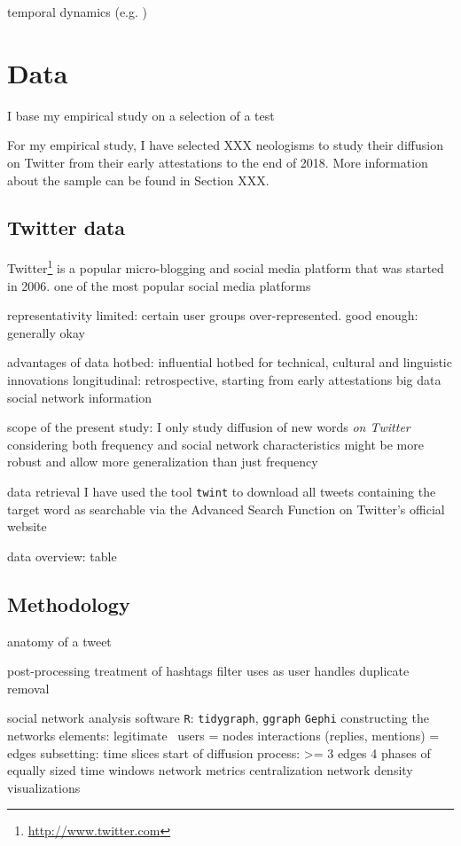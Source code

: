 \documentclass[draft, a4paper, abstract=on]{scrartcl}
\newcommand{\sw}[1]{\texttt{#1}}
\begin{document}
  temporal dynamics (e.g. )

\section{Data}

I base my empirical study on a selection of a test

For my empirical study, I have selected XXX neologisms to study their diffusion on Twitter from their early attestations to the end of 2018. More information about the sample can be found in Section XXX.

  \subsection{Twitter data}

  Twitter\footnote{\url{http://www.twitter.com}} is a popular micro-blogging and social media platform that was started in 2006.
  one of the most popular social media platforms

  representativity
  limited: certain user groups over-represented.
  good enough: generally okay \parencite{Grieve2019MappingLexical}

  advantages of data
  hotbed: influential hotbed for technical, cultural and linguistic innovations
  longitudinal: retrospective, starting from early attestations
  big data
  social network information

  scope of the present study:
  I only study diffusion of new words \emph{on Twitter}
  considering both frequency and social network characteristics might be more robust and allow more generalization than just frequency

  data retrieval
  I have used the tool \sw{twint}
  to download all tweets containing the target word
  as searchable via the Advanced Search Function on Twitter's official website

  data overview: table

  \subsection{Methodology}

  anatomy of a tweet

  post-processing
  treatment of hashtags
  filter uses as user handles
  duplicate removal

  social network analysis
  software
  \sw{R}: \sw{tidygraph}, \sw{ggraph}
  \sw{Gephi}
  constructing the networks
  elements: legitimate~\parencite{Goel2016SocialDynamics}
  users = nodes
  interactions (replies, mentions) = edges
  subsetting: time slices
  start of diffusion process: >= 3 edges
  4 phases of equally sized time windows
  network metrics
  centralization
  network density
  visualizations
\end{document}
